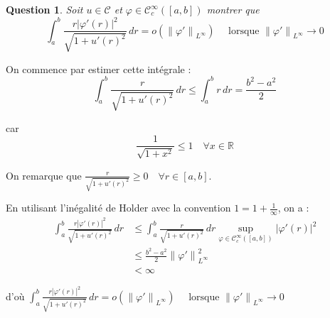 \documentclass{article}
\newcommand{\Real}{ \mathbb{R} }
\newcommand{\Abs}[1]{ \left| #1 \right| }
\newcommand{\FunctionClassCompact}[2]{ \mathcal{C}_c^{#1} \left( #2 \right) }
\newcommand{\FunctionWithSqrt}[1]{ \sqrt{1 + #1 ^2} }
\newcommand{\Norm}[2]{ \left\| #1 \right\|_{#2} }
\newcommand{\Integral}[4]{ \int_{#1}^{#2} #3 \, d#4 }
\newtheorem{question}{Question}[subsection]
\newenvironment{answer}
  {\color{blue}}
  {}
\newcommand{\QuestionAnswer}[2]{
    \begin{question}
        #1
    \end{question}
    \begin{answer}
        #2
    \end{answer}
}
\newcommand{\SetC}{\mathcal{C}}
\begin{document}
\QuestionAnswer{
    Soit $u \in \SetC$ et $\varphi \in \FunctionClassCompact{\infty}{[a, b]}$ montrer que
    $$\Integral{a}{b}{ \frac{r \Abs{\varphi'(r)}^2 }{\FunctionWithSqrt{u'(r)}} }{r} = o(\Norm{\varphi'}{L^{\infty}}) \quad \text{ lorsque } \Norm{\varphi'}{L^{\infty}} \to 0$$
}{
    On commence par estimer cette intégrale :
    $$\Integral{a}{b}{ \frac{r}{\FunctionWithSqrt{u'(r)}} }{r} \leq \Integral{a}{b}{ r }{r} = \frac{b^2-a^2}{2}$$

    car $$\frac{1}{\FunctionWithSqrt{x}} \leq 1 \quad \forall x \in \Real$$

    On remarque que $\frac{r}{\FunctionWithSqrt{u'(r)}} \geq 0 \quad \forall r \in [a,b]$.

    En utilisant l'inégalité de Holder avec la convention $1 = 1 + \frac{1}{\infty}$, on a :
    \begin{align*}
        \Integral{a}{b}{ \frac{r\Abs{\varphi'(r)}^2 }{\FunctionWithSqrt{u'(r)}} }{r}
        &\leq \Integral{a}{b}{ \frac{r}{\FunctionWithSqrt{u'(r)}} }{r} \underset{\varphi \in \FunctionClassCompact{\infty}{[a, b]}}{\sup}\Abs{\varphi'(r)}^2\\
        &\leq \frac{b^2-a^2}{2} \Norm{\varphi'}{L^\infty}^2 \\
        &< \infty
    \end{align*}

    d'où $\Integral{a}{b}{ \frac{r \Abs{\varphi'(r)}^2 }{\FunctionWithSqrt{u'(r)}} }{r} = o(\Norm{\varphi'}{L^{\infty}}) \quad \text{ lorsque } \Norm{\varphi'}{L^{\infty}} \to 0$
    
}
\end{document}
